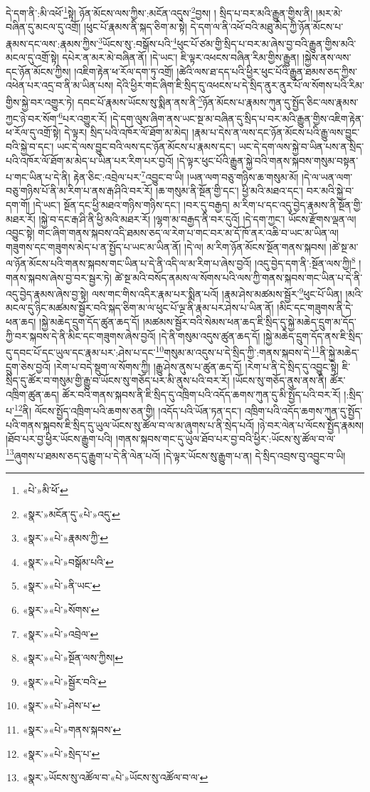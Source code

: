 དེ་དག་ནི་:མི་འཕོ་\footnote{«པེ་»མི་ཕོ་}སྟེ། ཉོན་མོངས་ལས་ཀྱིས་:མངོན་འདུས་\footnote{«སྣར་»མངོན་དུ་«པེ་»འདུ་}བྱས། །
སྲིད་པ་བར་མའི་རྒྱུན་གྱིས་ནི། །མར་མེ་བཞིན་དུ་མངལ་དུ་འགྲོ། །ཕུང་པོ་རྣམས་ནི་སྐད་ཅིག་མ་སྟེ། དེ་དག་ལ་ནི་འཕོ་བའི་མཐུ་མེད་ཀྱི་ཉོན་མོངས་པ་རྣམས་དང་ལས་:རྣམས་ཀྱིས་\footnote{«སྣར་»«པེ་»རྣམས་ཀྱི་}ཡོངས་སུ་:བསྒོས་པའི་\footnote{«སྣར་»«པེ་»བསྒོམ་པའི་}ཕུང་པོ་ཙམ་གྱི་སྲིད་པ་བར་མ་ཞེས་བྱ་བའི་རྒྱུན་གྱིས་མའི་མངལ་དུ་འགྲོ་སྟེ། དཔེར་ན་མར་མེ་བཞིན་ནོ། །དེ་ཡང་། ཇི་ལྟར་འཕངས་བཞིན་རིམ་གྱིས་རྒྱུན། །སྐྱེས་ནས་ལས་དང་ཉོན་མོངས་ཀྱིས། །འཇིག་རྟེན་ཕ་རོལ་དག་ཏུ་འགྲོ། །ཚེའི་ལས་ཐ་དད་པའི་ཕྱིར་ཕུང་པོའི་རྒྱུན་ཐམས་ཅད་ཀྱིས་འཕེན་པར་འདྲ་བ་ནི་མ་ཡིན་པས། དེའི་ཕྱིར་གང་ཞིག་ཇི་སྲིད་དུ་འཕངས་པ་དེ་སྲིད་ནུར་ནུར་པོ་ལ་སོགས་པའི་རིམ་གྱིས་སྐྱེ་བར་འགྱུར་ཏེ། དབང་པོ་རྣམས་ཡོངས་སུ་སྨིན་ནས་ནི་\footnote{«སྣར་»«པེ་»ནི་ཡང་}ཉོན་མོངས་པ་རྣམས་ཀུན་དུ་སྤྱོད་ཅིང་ལས་རྣམས་ཀྱང་ཉེ་བར་སོག་\footnote{«སྣར་»«པེ་»སོགས་}པར་འགྱུར་རོ། །དེ་དག་ལུས་ཞིག་ནས་ཡང་སྔ་མ་བཞིན་དུ་སྲིད་པ་བར་མའི་རྒྱུན་གྱིས་འཇིག་རྟེན་ཕ་རོལ་དུ་འགྲོ་སྟེ། དེ་ལྟར། སྲིད་པའི་འཁོར་ལོ་ཐོག་མ་མེད། །རྣམ་པ་དེས་ན་ལས་དང་ཉོན་མོངས་པའི་རྒྱུ་ལས་བྱུང་བའི་སྐྱེ་བ་དང་། ཡང་དེ་ལས་བྱུང་བའི་ལས་དང་ཉོན་མོངས་པ་རྣམས་དང་། ཡང་དེ་དག་ལས་སྐྱེ་བ་ཡིན་པས་ན་སྲིད་པའི་འཁོར་ལོ་ཐོག་མ་མེད་པ་ཡིན་པར་རིག་པར་བྱའོ། །དེ་ལྟར་ཕུང་པོའི་རྒྱུན་སྐྱེ་བའི་གནས་སྐབས་གསུམ་བསྟན་པ་གང་ཡིན་པ་དེ་ནི། རྟེན་ཅིང་:འབྲེལ་པར་\footnote{«སྣར་»«པེ་»འབྲེལ་}འབྱུང་བ་ཡི། །ཡན་ལག་བཅུ་གཉིས་ཆ་གསུམ་མོ། །དེ་ལ་ཡན་ལག་བཅུ་གཉིས་པོ་ནི་མ་རིག་པ་ནས་རྒ་ཤིའི་བར་རོ། །ཆ་གསུམ་ནི་སྔོན་གྱི་དང་། ཕྱི་མའི་མཐའ་དང་། བར་མའི་སྐྱེ་བ་དག་གོ། །དེ་ཡང་། སྔོན་དང་ཕྱི་མཐའ་གཉིས་གཉིས་དང་། །བར་དུ་བརྒྱད། མ་རིག་པ་དང་འདུ་བྱེད་རྣམས་ནི་སྔོན་གྱི་མཐར་རོ། །སྐྱེ་བ་དང་རྒ་ཤི་ནི་ཕྱི་མའི་མཐར་རོ། །ལྷག་མ་བརྒྱད་ནི་བར་དུའོ། །དེ་དག་ཀྱང་། ཡོངས་རྫོགས་ལྡན་ལ། འབྱུང་སྟེ། གང་ཞིག་གནས་སྐབས་འདི་ཐམས་ཅད་ལ་རེག་པ་གང་བར་མ་དོ་ཁོ་ནར་འཆི་བ་ཡང་མ་ཡིན་ལ། གཟུགས་དང་གཟུགས་མེད་པ་ན་སྤྱོད་པ་ཡང་མ་ཡིན་ནོ། །དེ་ལ། མ་རིག་ཉོན་མོངས་སྔོན་གནས་སྐབས། །ཚེ་སྔ་མ་ལ་ཉོན་མོངས་པའི་གནས་སྐབས་གང་ཡིན་པ་དེ་ནི་འདི་ལ་མ་རིག་པ་ཞེས་བྱའོ། །འདུ་བྱེད་དག་ནི་:སྔོན་ལས་ཀྱི།\footnote{«སྣར་»«པེ་»སྔོན་ལས་ཀྱིས།} །གནས་སྐབས་ཞེས་བྱ་བར་སྦྱར་ཏེ། ཚེ་སྔ་མའི་བསོད་ནམས་ལ་སོགས་པའི་ལས་ཀྱི་གནས་སྐབས་གང་ཡིན་པ་དེ་ནི་འདུ་བྱེད་རྣམས་ཞེས་བྱ་སྟེ། ལས་གང་གིས་འདིར་རྣམ་པར་སྨིན་པའོ། །རྣམ་ཤེས་མཚམས་སྦྱོར་\footnote{«སྣར་»«པེ་»སྦྱོར་བའི་}ཕུང་པོ་ཡིན། །མའི་མངལ་དུ་ཉིང་མཚམས་སྦྱོར་བའི་སྐད་ཅིག་མ་ལ་ཕུང་པོ་ལྔ་ནི་རྣམ་པར་ཤེས་པ་ཡིན་ནོ། །མིང་དང་གཟུགས་ནི་དེ་ཕན་ཆད། །སྐྱེ་མཆེད་དྲུག་དོད་ཚུན་ཆད་དོ། །མཚམས་སྦྱོར་བའི་སེམས་ཕན་ཆད་ཇི་སྲིད་དུ་སྐྱེ་མཆེད་དྲུག་མ་དོད་ཀྱི་བར་སྐབས་དེ་ནི་མིང་དང་གཟུགས་ཞེས་བྱའོ། །དེ་ནི་གསུམ་འདུས་ཚུན་ཆད་དོ། །སྐྱེ་མཆེད་དྲུག་དོད་ནས་ཇི་སྲིད་དུ་དབང་པོ་དང་ཡུལ་དང་རྣམ་པར་:ཤེས་པ་དང་\footnote{«སྣར་»«པེ་»ཤེས་པ་}གསུམ་མ་འདུས་པ་དེ་སྲིད་ཀྱི་:གནས་སྐབས་དེ་\footnote{«སྣར་»«པེ་»གནས་སྐབས་}ནི་སྐྱེ་མཆེད་དྲུག་ཅེས་བྱའོ། །རེག་པ་བདེ་སྡུག་ལ་སོགས་ཀྱི། །རྒྱུ་ཤེས་ནུས་པ་ཚུན་ཆད་དོ། །རེག་པ་ནི་དེ་སྲིད་དུ་འབྱུང་སྟེ། ཇི་སྲིད་དུ་ཚོར་བ་གསུམ་གྱི་རྒྱུ་བ་ཡོངས་སུ་གཅོད་པར་མི་ནུས་པའི་བར་རོ། །ཡོངས་སུ་གཅོད་ནུས་ནས་ནི། ཚོར་འཁྲིག་ཚུན་ཆད། ཚོར་བའི་གནས་སྐབས་ནི་ཇི་སྲིད་དུ་འཁྲིག་པའི་འདོད་ཆགས་ཀུན་དུ་མི་སྤྱོད་པའི་བར་རོ། །:སྲིད་པ་\footnote{«སྣར་»«པེ་»སྲེད་པ་}ནི། ལོངས་སྤྱོད་འཁྲིག་པའི་ཆགས་ཅན་གྱི། །འདོད་པའི་ཡོན་ཏན་དང་། འཁྲིག་པའི་འདོད་ཆགས་ཀུན་དུ་སྤྱོད་པའི་གནས་སྐབས་ཇི་སྲིད་དུ་ཡུལ་ཡོངས་སུ་ཚོལ་བ་ལ་མ་ཞུགས་པ་ནི་སྲེད་པའོ། །ཉེ་བར་ལེན་པ་ལོངས་སྤྱོད་རྣམས། །ཐོབ་པར་བྱ་ཕྱིར་ཡོངས་རྒྱུག་པའི། །གནས་སྐབས་གང་དུ་ཡུལ་ཐོབ་པར་བྱ་བའི་ཕྱིར་:ཡོངས་སུ་ཚོལ་བ་ལ་\footnote{«སྣར་»ཡོངས་སུ་འཚོལ་བ་«པེ་»ཡོངས་སུ་འཚོལ་བ་ལ་}ཞུགས་པ་ཐམས་ཅད་དུ་རྒྱུག་པ་དེ་ནི་ལེན་པའོ། །དེ་ལྟར་ཡོངས་སུ་རྒྱུག་པ་ན། དེ་སྲིད་འབྲས་བུ་འབྱུང་བ་ཡི། 